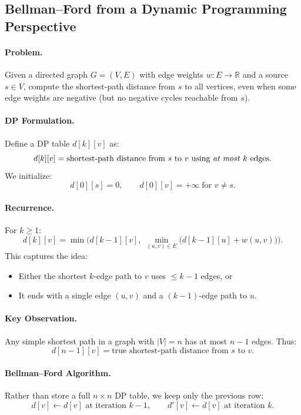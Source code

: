 \documentclass[9pt]{extarticle}
\begin{document}
\subsection{Bellman--Ford from a Dynamic Programming Perspective}

\paragraph{Problem.}
Given a directed graph $G=(V,E)$ with edge weights $w:E\to\mathbb{R}$ and a source $s\in V$, compute the shortest-path distance from $s$ to all vertices, even when some edge weights are negative (but no negative cycles reachable from $s$).

\paragraph{DP Formulation.}
Define a DP table $d[k][v]$ as:
\[
  d[k][v] = \text{shortest-path distance from $s$ to $v$ using \emph{at most} $k$ edges}.
\]
We initialize:
\[
  d[0][s] = 0, \qquad d[0][v] = +\infty \;\text{for } v \neq s.
\]

\paragraph{Recurrence.}
For $k \ge 1$:
\[
  d[k][v]
    = \min\Big(
        d[k-1][v],\;
        \min_{(u,v)\in E} \big( d[k-1][u] + w(u,v) \big)
      \Big).
\]
This captures the idea:
\begin{itemize}
  \item Either the shortest $k$-edge path to $v$ uses $\le k-1$ edges, or
  \item It ends with a single edge $(u,v)$ and a $(k-1)$-edge path to $u$.
\end{itemize}

\paragraph{Key Observation.}
Any simple shortest path in a graph with $|V|=n$ has at most $n-1$ edges.  
Thus:
\[
  d[n-1][v] = \text{true shortest-path distance from $s$ to $v$}.
\]

\paragraph{Bellman--Ford Algorithm.}
Rather than store a full $n \times n$ DP table, we keep only the previous row:
\[
  d[v] \gets d[v] \text{ at iteration $k-1$}, \qquad
  d'[v] \gets d[v] \text{ at iteration $k$}.
\]
\end{document}
